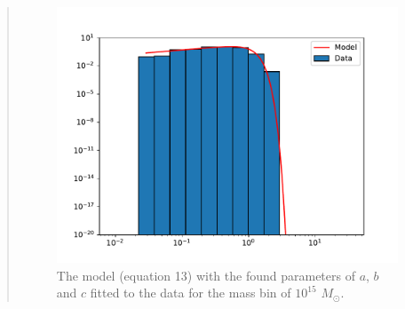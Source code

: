 \begin{quote}
\begin{figure}[!ht]
\centering
\includegraphics[scale=0.7]{plots/satgals_m15.pdf}
\caption{The model (equation 13) with the found parameters of $a$, $b$ and $c$ fitted to the data for the mass bin of $10^{15}$ $M_{\odot}$.}
\end{figure}
\end{quote}
\newpage


















